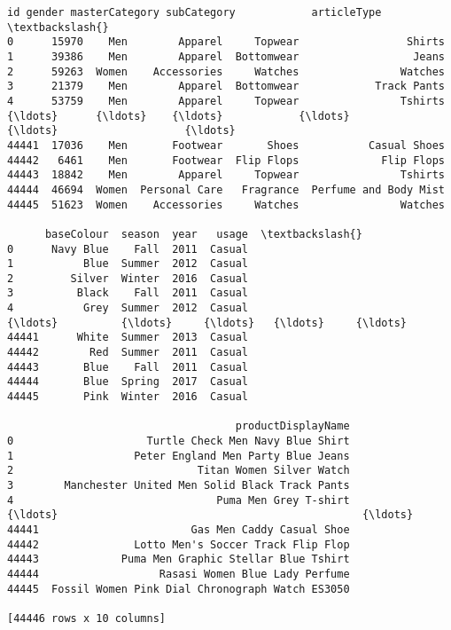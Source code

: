 \documentclass[11pt]{article}
\makeatletter
\newcommand{\boxspacing}{\kern\kvtcb@left@rule\kern\kvtcb@boxsep}
\newcommand{\prompt}[4]{
        {\ttfamily\llap{{\color{#2}[#3]:\hspace{3pt}#4}}\vspace{-\baselineskip}}
    }
\makeatother
\begin{document}
            \begin{tcolorbox}[breakable, size=fbox, boxrule=.5pt, pad at break*=1mm, opacityfill=0]
\prompt{Out}{outcolor}{9}{\boxspacing}
\begin{Verbatim}[commandchars=\\\{\}]
          id gender masterCategory subCategory            articleType  \textbackslash{}
0      15970    Men        Apparel     Topwear                 Shirts
1      39386    Men        Apparel  Bottomwear                  Jeans
2      59263  Women    Accessories     Watches                Watches
3      21379    Men        Apparel  Bottomwear            Track Pants
4      53759    Men        Apparel     Topwear                Tshirts
{\ldots}      {\ldots}    {\ldots}            {\ldots}         {\ldots}                    {\ldots}
44441  17036    Men       Footwear       Shoes           Casual Shoes
44442   6461    Men       Footwear  Flip Flops             Flip Flops
44443  18842    Men        Apparel     Topwear                Tshirts
44444  46694  Women  Personal Care   Fragrance  Perfume and Body Mist
44445  51623  Women    Accessories     Watches                Watches

      baseColour  season  year   usage  \textbackslash{}
0      Navy Blue    Fall  2011  Casual
1           Blue  Summer  2012  Casual
2         Silver  Winter  2016  Casual
3          Black    Fall  2011  Casual
4           Grey  Summer  2012  Casual
{\ldots}          {\ldots}     {\ldots}   {\ldots}     {\ldots}
44441      White  Summer  2013  Casual
44442        Red  Summer  2011  Casual
44443       Blue    Fall  2011  Casual
44444       Blue  Spring  2017  Casual
44445       Pink  Winter  2016  Casual

                                    productDisplayName
0                     Turtle Check Men Navy Blue Shirt
1                   Peter England Men Party Blue Jeans
2                             Titan Women Silver Watch
3        Manchester United Men Solid Black Track Pants
4                                Puma Men Grey T-shirt
{\ldots}                                                {\ldots}
44441                        Gas Men Caddy Casual Shoe
44442               Lotto Men's Soccer Track Flip Flop
44443             Puma Men Graphic Stellar Blue Tshirt
44444                   Rasasi Women Blue Lady Perfume
44445  Fossil Women Pink Dial Chronograph Watch ES3050

[44446 rows x 10 columns]
\end{Verbatim}
\end{tcolorbox}
        
\end{document}
